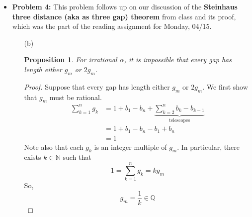 \documentclass[12pt, reqno]{amsart}
\newtheorem{prop}{Proposition}[section]
\theoremstyle{definition}
\theoremstyle{remark}
\begin{document}
\begin{itemize}
\vspace{0.2 cm}

\item {\bf{Problem 4:}} This problem follows up on our discussion of the {\bf{Steinhaus three distance (aka as three gap) theorem}} from class and its proof, which was the part of the reading assignment for Monday, 04/15. 

\vspace{0.1 cm}
\begin{itemize}


\vspace{0.1 cm}
\item[(b)] %

\begin{prop}
For irrational $\alpha$, it is impossible that every gap has length either $g_m$ or $2 g_m$.
\end{prop}


\begin{proof}
    Suppose that every gap has length either $g_{m}$ or $2g_{m}$. We first show that $g_{m}$ must be rational.
\begin{align*}
\sum_{k=1}^{n}g_{k}&= 1+b_{1}-b_{n}+\underbrace{\sum_{k=2}^{n}b_{k}-b_{k-1}}_{\text{telescopes}}\\
&= 1+b_{1}-b_{n} -b_{1}+b_{n}\\
&= 1
\end{align*}
Note also that each $g_{k}$ is an integer multiple of $g_{m}$. In particular, there exists $k\in \mathbb{N}$ such that $$1=\sum_{k=1}^{n}g_{k}=kg_{m}$$So, $$g_{m}= \frac{1}{k}\in\mathbb{Q}$$


\end{proof}
\end{itemize}
\end{itemize}
\end{document}
